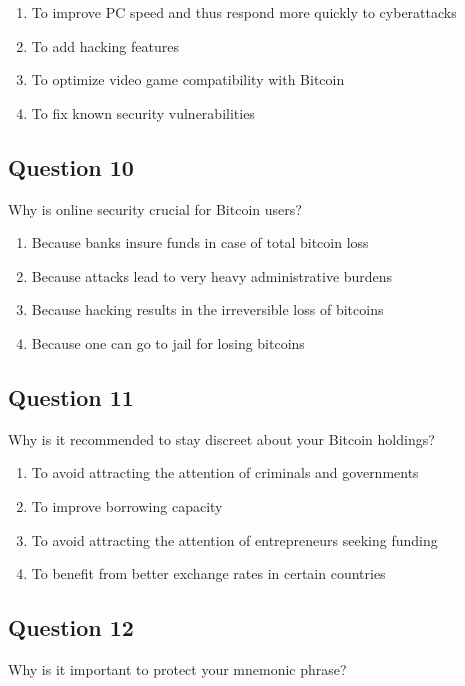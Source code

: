 \documentclass[12pt,a4paper]{article}
\begin{document}
\begin{enumerate}[label=\Alph*., leftmargin=*]
\item To improve PC speed and thus respond more quickly to cyberattacks
\item To add hacking features
\item To optimize video game compatibility with Bitcoin
\item To fix known security vulnerabilities
\end{enumerate}

\bigskip


\subsection*{Question 10}
Why is online security crucial for Bitcoin users?

\begin{enumerate}[label=\Alph*., leftmargin=*]
\item Because banks insure funds in case of total bitcoin loss
\item Because attacks lead to very heavy administrative burdens
\item Because hacking results in the irreversible loss of bitcoins
\item Because one can go to jail for losing bitcoins
\end{enumerate}

\bigskip


\subsection*{Question 11}
Why is it recommended to stay discreet about your Bitcoin holdings?

\begin{enumerate}[label=\Alph*., leftmargin=*]
\item To avoid attracting the attention of criminals and governments
\item To improve borrowing capacity
\item To avoid attracting the attention of entrepreneurs seeking funding
\item To benefit from better exchange rates in certain countries
\end{enumerate}

\bigskip


\subsection*{Question 12}
Why is it important to protect your mnemonic phrase?
\end{document}
